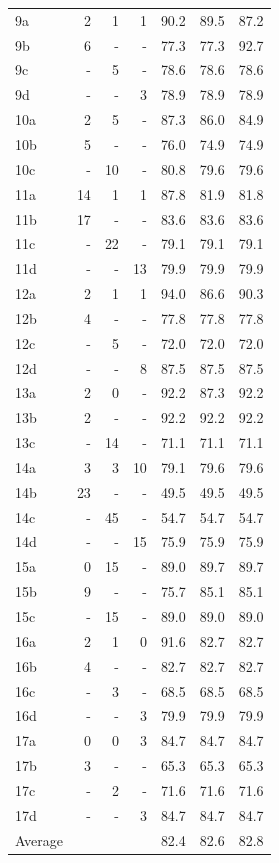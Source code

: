 \begin{longtable}{lrrrrrr}
  \addlinespace
  9a & 2 & 1 & 1 & 90.2 & 89.5 & 87.2 \\
  9b & 6 & - & - & 77.3 & 77.3 & 92.7 \\
  9c & - & 5 & - & 78.6 & 78.6 & 78.6 \\
  9d & - & - & 3 & 78.9 & 78.9 & 78.9 \\
  \addlinespace
  10a & 2 & 5 & - & 87.3 & 86.0 & 84.9 \\
  10b & 5 & - & - & 76.0 & 74.9 & 74.9 \\
  10c & - & 10 & - & 80.8 & 79.6 & 79.6 \\
  \addlinespace
  11a & 14 & 1 & 1 & 87.8 & 81.9 & 81.8 \\
  11b & 17 & - & - & 83.6 & 83.6 & 83.6 \\
  11c & - & 22 & - & 79.1 & 79.1 & 79.1 \\
  11d & - & - & 13 & 79.9 & 79.9 & 79.9 \\
  \addlinespace
  12a & 2 & 1 & 1 & 94.0 & 86.6 & 90.3 \\
  12b & 4 & - & - & 77.8 & 77.8 & 77.8 \\
  12c & - & 5 & - & 72.0 & 72.0 & 72.0 \\
  12d & - & - & 8 & 87.5 & 87.5 & 87.5 \\
  \addlinespace
  13a & 2 & 0 & - & 92.2 & 87.3 & 92.2 \\
  13b & 2 & - & - & 92.2 & 92.2 & 92.2 \\
  13c & - & 14 & - & 71.1 & 71.1 & 71.1 \\
  \addlinespace
  14a & 3 & 3 & 10 & 79.1 & 79.6 & 79.6 \\
  14b & 23 & - & - & 49.5 & 49.5 & 49.5 \\
  14c & - & 45 & - & 54.7 & 54.7 & 54.7 \\
  14d & - & - & 15 & 75.9 & 75.9 & 75.9 \\
  \addlinespace
  15a & 0 & 15 & - & 89.0 & 89.7 & 89.7 \\
  15b & 9 & - & - & 75.7 & 85.1 & 85.1 \\
  15c & - & 15 & - & 89.0 & 89.0 & 89.0 \\
  \addlinespace
  16a & 2 & 1 & 0 & 91.6 & 82.7 & 82.7 \\
  16b & 4 & - & - & 82.7 & 82.7 & 82.7 \\
  16c & - & 3 & - & 68.5 & 68.5 & 68.5 \\
  16d & - & - & 3 & 79.9 & 79.9 & 79.9 \\
  \addlinespace
  17a & 0 & 0 & 3 & 84.7 & 84.7 & 84.7 \\
  17b & 3 & - & - & 65.3 & 65.3 & 65.3 \\
  17c & - & 2 & - & 71.6 & 71.6 & 71.6 \\
  17d & - & - & 3 & 84.7 & 84.7 & 84.7 \\
  \midrule
  Average & & & & 82.4 & 82.6 & 82.8 \\
\end{longtable}
